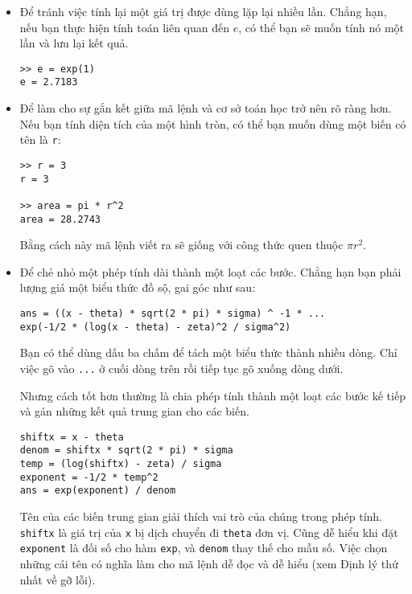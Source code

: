 \documentclass[12pt]{book}
\begin{document}
\begin{itemize}

\item Để tránh việc tính lại một giá trị được dùng lặp lại nhiều lần.
Chẳng hạn, nếu bạn thực hiện tính toán liên quan đến $e$, có thể
bạn sẽ muốn tính nó một lần và lưu lại kết quả.

\begin{verbatim}
>> e = exp(1)
e = 2.7183
\end{verbatim}


\item Để làm cho sự gắn kết giữa mã lệnh và cơ sở toán học trở nên
rõ ràng hơn. Nếu bạn tính diện tích của một hình tròn, có thể bạn muốn
dùng một biến có tên là {\tt r}:

\begin{verbatim}
>> r = 3
r = 3

>> area = pi * r^2
area = 28.2743
\end{verbatim}
%
Bằng cách này mã lệnh viết ra sẽ giống với công thức quen thuộc $\pi r^2$.


\item Để chẻ nhỏ một phép tính dài thành một loạt các bước. Chẳng hạn
bạn phải lượng giá một biểu thức đồ sộ, gai góc như sau:

\begin{verbatim}
ans = ((x - theta) * sqrt(2 * pi) * sigma) ^ -1 * ...
exp(-1/2 * (log(x - theta) - zeta)^2 / sigma^2)
\end{verbatim}
%
Bạn có thể dùng dấu ba chấm để tách một biểu thức thành nhiều dòng.
Chỉ việc gõ vào {\tt ...} ở cuối dòng trên rồi tiếp tục gõ xuống dòng dưới.

Nhưng cách tốt hơn thường là chia phép tính thành một loạt các bước
kế tiếp và gán những kết quả trung gian cho các biến.

\begin{verbatim}
shiftx = x - theta
denom = shiftx * sqrt(2 * pi) * sigma
temp = (log(shiftx) - zeta) / sigma
exponent = -1/2 * temp^2
ans = exp(exponent) / denom
\end{verbatim}
%
Tên của các biến trung gian giải thích vai trò của chúng trong phép tính.
{\tt shiftx} là giá trị của {\tt x} bị dịch chuyển đi {\tt theta} đơn vị. Cũng 
dễ hiểu khi đặt {\tt exponent} là đối số cho hàm {\tt exp}, và {\tt denom} 
thay thế cho mẫu số. Việc chọn những cái tên có nghĩa làm cho mã lệnh 
dễ đọc và dễ hiểu (xem Định lý thứ nhất về gỡ lỗi).

\end{itemize}
\end{document}
